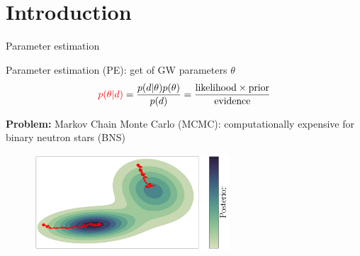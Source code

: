 \documentclass[usenames,dvipsnames,t]{beamer}
\begin{document}







\section{Introduction}

\begin{frame}{Parameter estimation}

\def\x{3mm}
\def\y{2mm}

Parameter estimation (PE): get  of GW parameters $\theta$ %
\begin{equation*}
    \textcolor{red}{p(\theta | d)} = \frac{p(d | \theta) p(\theta)}{p(d)} = \frac{\text{likelihood} \times \text{prior}}{\text{evidence}}
\end{equation*}

\vspace{1mm}


\begin{tcolorbox}[colback=blue!10, boxrule=0pt]
  \textbf{Problem:} Markov Chain Monte Carlo (MCMC): computationally expensive for binary neutron stars (BNS)
\end{tcolorbox}


\vspace{-1mm}

\begin{figure}
  \centering
  \includegraphics[width=0.65\textwidth]{Figures/mixture_of_gaussians_projection_no_title_colorbar.pdf}
  \caption*{}
\end{figure}

\end{frame}
\end{document}
